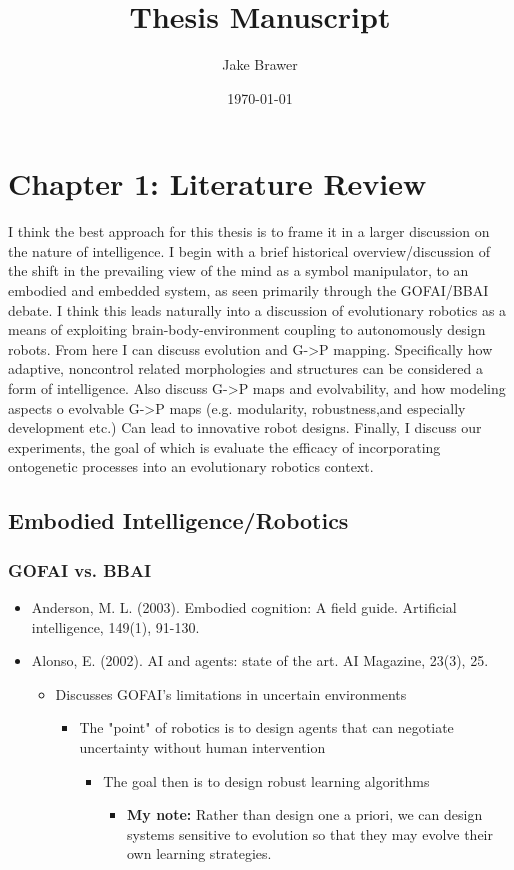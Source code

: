 \documentclass[11pt]{article}
\author{Jake Brawer}
\date{\today}
\title{Thesis Manuscript}
\begin{document}
\maketitle

\section*{Chapter 1: Literature Review}
\label{sec:orgheadline13}
I think the best approach for this thesis is to frame it in a larger discussion on the nature of intelligence. I begin with a brief historical overview/discussion of the shift in the prevailing view of the mind as a symbol manipulator, to an embodied and embedded system, as seen primarily through the GOFAI/BBAI debate. I think this leads naturally into a discussion of evolutionary robotics as a means of exploiting brain-body-environment coupling to autonomously design robots. From here I can discuss evolution and G->P mapping. Specifically how adaptive, noncontrol related morphologies and structures can be considered a form of intelligence. Also discuss G->P maps and evolvability, and how modeling aspects o evolvable G->P maps (e.g. modularity, robustness,and especially development etc.) Can lead to innovative robot designs. Finally, I discuss our experiments, the goal of which is evaluate the efficacy of incorporating ontogenetic processes into an evolutionary robotics context.
\subsection*{Embodied Intelligence/Robotics}
\label{sec:orgheadline3}

\subsubsection*{GOFAI vs. BBAI}
\label{sec:orgheadline1}
\begin{itemize}
\item Anderson, M. L. (2003). Embodied cognition: A field guide. Artificial intelligence, 149(1), 91-130.
\item Alonso, E. (2002). AI and agents: state of the art. AI Magazine, 23(3), 25.
\begin{itemize}
\item Discusses GOFAI's limitations in uncertain environments
\begin{itemize}
\item The "point" of robotics is to design agents that can negotiate uncertainty without human intervention 
\begin{itemize}
\item The goal then is to design robust learning algorithms
\begin{itemize}
\item \textbf{My note:} Rather than design one a priori, we can design systems sensitive to evolution so that they may evolve their own learning strategies.
\end{itemize}
\end{itemize}
\end{itemize}
\end{itemize}
\end{itemize}
\end{document}
